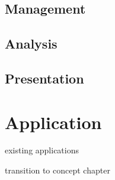 
\subsection{Management} %
\label{sub:management}



\subsection{Analysis} %
\label{sub:analysis}


\subsection{Presentation} %
\label{sub:presentation}




\section{Application} %
\label{sec:application}

existing applications



\vspace{2em}

transition to concept chapter